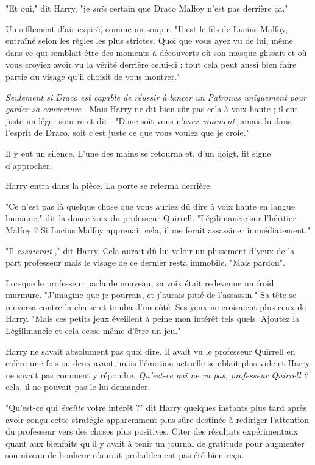 "Et oui," dit Harry, "je \emph{suis}  certain que Draco Malfoy n'est pas derrière ça."

Un sifflement d'air expiré, comme un soupir. "Il est le fils de Lucius Malfoy, entraîné selon les règles les plus strictes. Quoi que vous ayez vu de lui, même dans ce qui semblait être des moments à découverts où son masque glissait et où vous croyiez avoir vu la vérité derrière celui-ci : tout cela peut aussi bien faire partie du visage qu'il choisit de vous montrer."

\emph{Seulement si Draco est capable de réussir à lancer un Patronus uniquement pour garder sa couverture} . Mais Harry ne dit bien sûr pas cela à voix haute ; il eut juste un léger sourire et dit : "Donc soit vous n'avez \emph{vraiment}  jamais lu dans l'esprit de Draco, soit c'est juste ce que vous voulez que je croie."

Il y eut un silence. L'une des mains se retourna et, d'un doigt, fit signe d'approcher.

Harry entra dans la pièce. La porte se referma derrière.

"Ce n'est pas là quelque chose que vous auriez dû dire à voix haute en langue humaine," dit la douce voix du professeur Quirrell. "Légilimancie sur l'héritier Malfoy ? Si Lucius Malfoy apprenait cela, il me ferait assassiner immédiatement."

"Il \emph{essaierait} ," dit Harry. Cela aurait dû lui valoir un plissement d'yeux de la part professeur mais le visage de ce dernier resta immobile. "Mais pardon".

Lorsque le professeur parla de nouveau, sa voix était redevenue un froid murmure. "J'imagine que je pourrais, et j'aurais pitié de l'assassin." Sa tête se renversa contre la chaise et tomba d'un côté. Ses yeux ne croisaient plus ceux de Harry. "Mais ces petits jeux éveillent à peine mon intérêt tels quels. Ajoutez la Légilimancie et cela cesse même d'être un jeu."

Harry ne savait absolument pas quoi dire. Il avait vu le professeur Quirrell en colère une fois ou deux avant, mais l'émotion actuelle semblait plus vide et Harry ne savait pas comment y répondre. \emph{Qu'est-ce qui ne va pas, professeur Quirrell}  \emph{?}  cela, il ne pouvait pas le lui demander.

"Qu'est-ce qui \emph{éveille } votre intérêt ?" dit Harry quelques instants plus tard après avoir conçu cette stratégie apparemment plus sûre destinée à rediriger l'attention du professeur vers des choses plus positives. Citer des résultats expérimentaux quant aux bienfaits qu'il y avait à tenir un journal de gratitude pour augmenter son niveau de bonheur n'aurait probablement pas été bien reçu.

